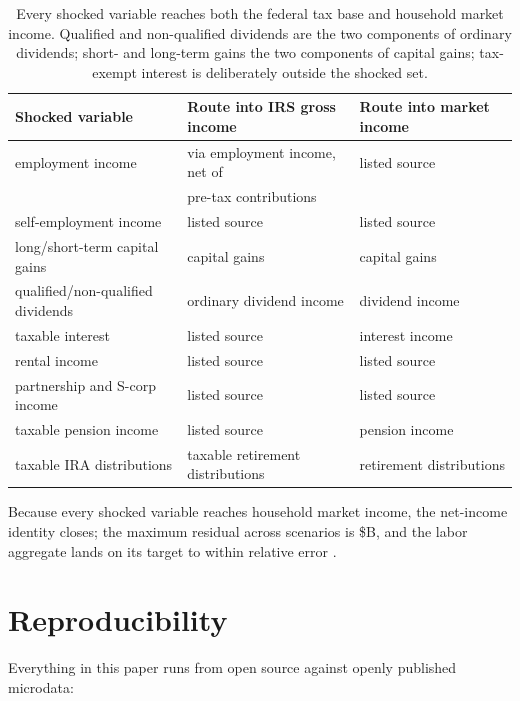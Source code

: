 \begin{table}[h]
\centering
\small
\begin{tabular}{lll}
\toprule
Shocked variable & Route into IRS gross income & Route into market income \\
\midrule
employment income & via employment income, net of & listed source \\
 & pre-tax contributions & \\
self-employment income & listed source & listed source \\
long/short-term capital gains & capital gains & capital gains \\
qualified/non-qualified dividends & ordinary dividend income & dividend income \\
taxable interest & listed source & interest income \\
rental income & listed source & listed source \\
partnership and S-corp income & listed source & listed source \\
taxable pension income & listed source & pension income \\
taxable IRA distributions & taxable retirement distributions & retirement distributions \\
\bottomrule
\end{tabular}
\caption{Every shocked variable reaches both the federal tax base and
household market income. Qualified and non-qualified dividends are the two
components of ordinary dividends; short- and long-term gains the two
components of capital gains; tax-exempt interest is deliberately outside the
shocked set.}
\label{tab:routing}
\end{table}

Because every shocked variable reaches household market income, the
net-income identity closes; the maximum residual across scenarios is
\$\genIdentityMaxResidual B, and the labor aggregate lands on its target to
within relative error \genLaborTargetMaxErr{}.

\clearpage
\section{Reproducibility}\label{app:repro}

Everything in this paper runs from open source against openly published
microdata:

